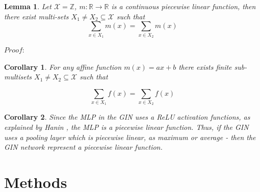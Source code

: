 \documentclass{article}
\newtheorem{lemma}[theorem]{Lemma}
\newtheorem{corollary}{Corollary}[theorem]
\begin{document}
\begin{lemma}
    Let $\mathcal{X}=\mathbb{Z}$, $m:\mathbb{R}\to\mathbb{R}$ is a continuous piecewise linear function,
    then there exist multi-sets $X_1 \neq X_2 \subseteq \mathcal{X}$ such that \\
    \[ \sum_{x\in X_1}m(x) = \sum_{x\in X_2}m(x) \]

\end{lemma}
$Proof:$ \\



\begin{corollary}
For any affine function $m(x) = ax + b $ there exists finite sub-multisets $X_1 \neq X_2 \subseteq \mathcal{X}$ such that

\[ \sum_{x\in X_1}f(x) = \sum_{x\in X_2}f(x) \]
\end{corollary}
\begin{corollary}
Since the MLP in the GIN uses a ReLU activation functions, as explained by Hanin \cite{Hanin}, the MLP is a piecewise linear function. 
Thus, if the GIN uses a pooling layer which is piecewise linear, as maximum or average - then the GIN network represent a piecewise linear function.
\end{corollary}



\part*{Methods}
\end{document}
